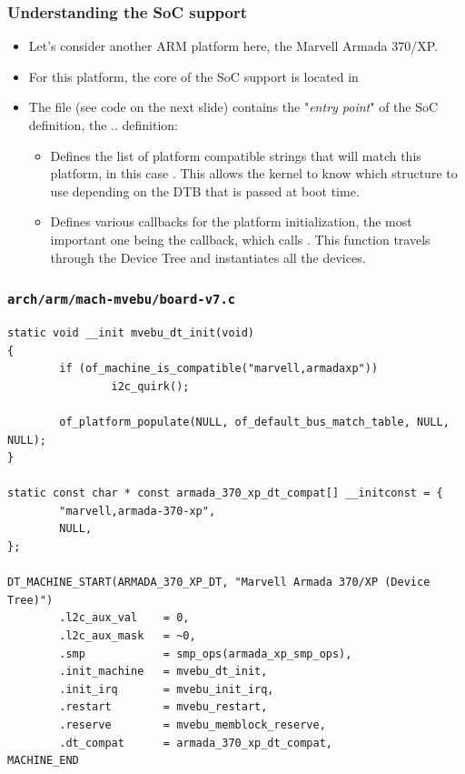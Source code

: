 \begin{frame}
  \frametitle{Understanding the SoC support}
  \begin{itemize}
  \item Let's consider another ARM platform here, the Marvell Armada
    370/XP.
  \item For this platform, the core of the SoC support is located in
  \item The  file (see code on the next slide)
    contains the "{\em entry point}" of the SoC definition, the
     ..  definition:
    \begin{itemize}
    \item Defines the list of platform compatible strings that will
      match this platform, in this case
      . This allows the kernel to know
      which  structure to use depending on the DTB
      that is passed at boot time.
    \item Defines various callbacks for the platform initialization,
      the most important one being the  callback,
      which calls . This function travels
      through the Device Tree and instantiates all the devices.
    \end{itemize}
  \end{itemize}
\end{frame}

\begin{frame}[fragile]
  \frametitle{{\tt arch/arm/mach-mvebu/board-v7.c}}
  \begin{block}{}
    \begin{verbatim}
static void __init mvebu_dt_init(void)
{
        if (of_machine_is_compatible("marvell,armadaxp"))
                i2c_quirk();

        of_platform_populate(NULL, of_default_bus_match_table, NULL, NULL);
}

static const char * const armada_370_xp_dt_compat[] __initconst = {
        "marvell,armada-370-xp",
        NULL,
};

DT_MACHINE_START(ARMADA_370_XP_DT, "Marvell Armada 370/XP (Device Tree)")
        .l2c_aux_val    = 0,
        .l2c_aux_mask   = ~0,
        .smp            = smp_ops(armada_xp_smp_ops),
        .init_machine   = mvebu_dt_init,
        .init_irq       = mvebu_init_irq,
        .restart        = mvebu_restart,
        .reserve        = mvebu_memblock_reserve,
        .dt_compat      = armada_370_xp_dt_compat,
MACHINE_END
  \end{verbatim}
 \end{block}
\end{frame}

